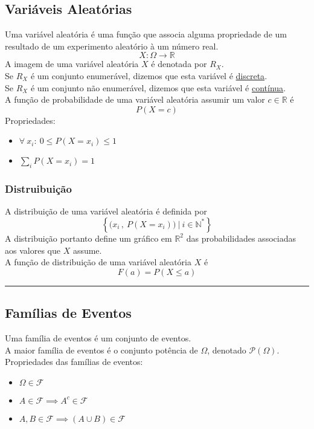 \documentclass{article}
\begin{document}
\subsection{Variáveis Aleatórias}
Uma variável aleatória é uma função que associa alguma propriedade de um resultado de um experimento aleatório à um número real.
\[ X: \Omega \to \mathbb{R} \]
A imagem de uma variável aleatória $X$ é denotada por $R_X$. \\[5pt]
Se $R_X$ é um conjunto enumerável, dizemos que esta variável é \uline{discreta}. \\
Se $R_X$ é um conjunto não enumerável, dizemos que esta variável é \uline{contínua}. \\[10pt]
A função de probabilidade de uma variável aleatória assumir um valor $c \in \mathbb{R}$ é
\[ P(X = c) \]
Propriedades:
\begin{itemize}
  \item $\forall\: x_i:\> 0 \leq P(X = x_i) \leq 1$
  \item $\sum\limits_i P(X = x_i) = 1$
\end{itemize}

\subsubsection{Distruibuição}
A distribuição de uma variável aleatória é definida por
\[ \left\{ \big( x_i\,,\: P(X = x_i) \big) \:\Big|\: i \in \mathbb{N}^* \right\} \]
A distribuição portanto define um gráfico em $\mathbb{R}^2$ das probabilidades associadas aos valores que $X$ assume. \\[10pt]
A função de distribuição de uma variável aleatória $X$ é
\[ F(a) = P(X \leq a) \]


\vspace{10pt}\hrule

\subsection{Famílias de Eventos}
Uma família de eventos é um conjunto de eventos. \\
A maior família de eventos é o conjunto potência de $\Omega$, denotado $\mathcal{P}(\Omega)$. \\[5pt]
Propriedades das famílias de eventos:
\begin{itemize}
  \item $\Omega \in \mathcal{F}$
  \item $A \in \mathcal{F} \implies A^c \in \mathcal{F}$
  \item $A, B \in \mathcal{F} \implies (A \cup B) \in \mathcal{F}$
\end{itemize}
\end{document}
